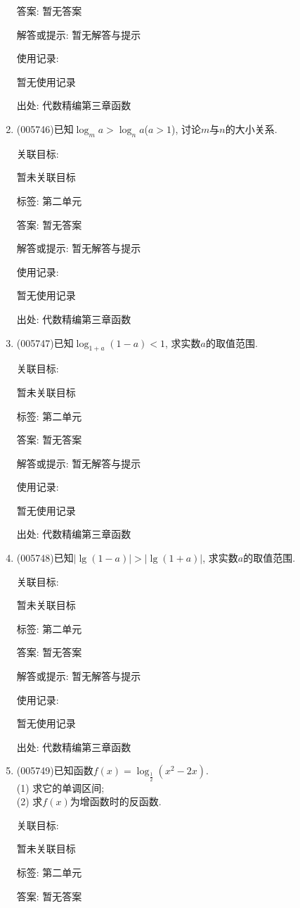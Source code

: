\documentclass[10pt,a4paper]{article}
\begin{document}
\begin{enumerate}[1.]
答案: 暂无答案

解答或提示: 暂无解答与提示

使用记录:

暂无使用记录


出处: 代数精编第三章函数
\item { (005746)}已知$\log_ma>\log_na$($a>1$), 讨论$m$与$n$的大小关系.


关联目标:

暂未关联目标



标签: 第二单元

答案: 暂无答案

解答或提示: 暂无解答与提示

使用记录:

暂无使用记录


出处: 代数精编第三章函数
\item { (005747)}已知$\log_{1+a}(1-a)<1$, 求实数$a$的取值范围.


关联目标:

暂未关联目标



标签: 第二单元

答案: 暂无答案

解答或提示: 暂无解答与提示

使用记录:

暂无使用记录


出处: 代数精编第三章函数
\item { (005748)}已知$|\lg (1-a)|>|\lg (1+a)|$, 求实数$a$的取值范围.


关联目标:

暂未关联目标



标签: 第二单元

答案: 暂无答案

解答或提示: 暂无解答与提示

使用记录:

暂无使用记录


出处: 代数精编第三章函数
\item { (005749)}已知函数$f(x)=\log_{\frac 12}(x^2-2x)$.\\
(1) 求它的单调区间;\\
(2) 求$f(x)$为增函数时的反函数.


关联目标:

暂未关联目标



标签: 第二单元

答案: 暂无答案


\end{enumerate}
\end{document}
